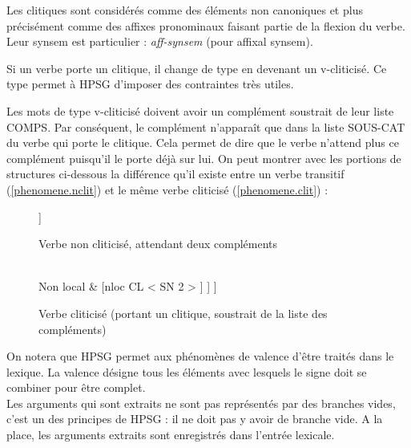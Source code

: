 Les clitiques sont considérés comme des éléments non canoniques et plus précisément comme des affixes pronominaux faisant partie de la flexion du verbe.
Leur synsem est particulier : \emph{aff-synsem} (pour affixal synsem).

Si un verbe porte un clitique, il change de type en devenant un v-cliticisé.
Ce type permet à HPSG d'imposer des contraintes très utiles.

Les mots de type v-cliticisé doivent avoir un complément soustrait de leur liste COMPS.
Par conséquent, le complément n'apparaît que dans la liste SOUS-CAT du verbe qui porte le clitique.
Cela permet de dire que le verbe n'attend plus ce complément puisqu'il le porte déjà sur lui.
On peut montrer avec les portions de structures ci-dessous la différence qu'il existe entre un verbe transitif (\autoref{phenomene.nclit}) et le même verbe cliticisé (\autoref{phenomene.clit}) :\\

\begin{figure}[ht]
\centering
\begin{avm}
  [{}
    Phon & </\emph{mange}/> \\
    Synsem = Cat & [{cat}
                    sous-cat & < SN {1}, SN {2} >
                   ]
  ]
\end{avm}
\caption{Verbe non cliticisé, attendant deux compléments\label{phenomene.nclit}}
\end{figure}
\begin{figure}[ht]
\centering
\begin{avm}
  [{}
    Phon & </\emph{le mange}/> \\
    Synsem & [{synsem}
              Local = Cat & [{cat}
                             sous-cat < SN {1} >
                            ] \\
              Non local & [{nloc}
                           CL < SN {2} >
                          ]
             ]
  ]
\end{avm}
\caption{Verbe cliticisé (portant un clitique, soustrait de la liste des compléments)\label{phenomene.clit}}
\end{figure}

On notera que HPSG permet aux phénomènes de valence d'être traités dans le lexique.
La valence désigne tous les éléments avec lesquels le signe doit se combiner pour être complet.\\

Les arguments qui sont extraits ne sont pas représentés par des branches vides, c'est un des principes de HPSG : il ne doit pas y avoir de branche vide.
A la place, les arguments extraits sont enregistrés dans l'entrée lexicale.

